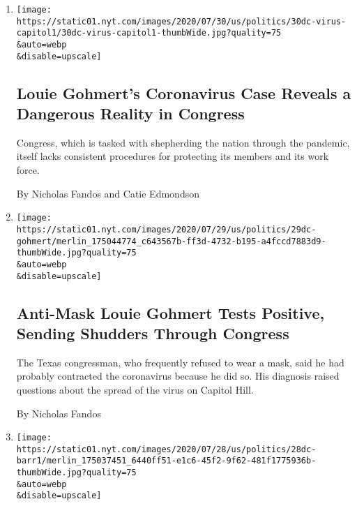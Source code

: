 \begin{enumerate}
\def\labelenumi{\arabic{enumi}.}
\item
  \href{/2020/07/30/us/politics/gohmert-coronavirus-congress.html}{}

  \texttt{[image: https://static01.nyt.com/images/2020/07/30/us/politics/30dc-virus-capitol1/30dc-virus-capitol1-thumbWide.jpg?quality=75\\\&auto=webp\\\&disable=upscale]}

  \hypertarget{louie-gohmerts-coronavirus-case-reveals-a-dangerous-reality-in-congress}{%
  \subsection{Louie Gohmert's Coronavirus Case Reveals a Dangerous
  Reality in
  Congress}\label{louie-gohmerts-coronavirus-case-reveals-a-dangerous-reality-in-congress}}

  Congress, which is tasked with shepherding the nation through the
  pandemic, itself lacks consistent procedures for protecting its
  members and its work force.

  By Nicholas Fandos and Catie Edmondson
\item
  \href{/2020/07/29/us/politics/louie-gohmert-positive-coronavirus-mask.html}{}

  \texttt{[image: https://static01.nyt.com/images/2020/07/29/us/politics/29dc-gohmert/merlin\_175044774\_c643567b-ff3d-4732-b195-a4fccd7883d9-thumbWide.jpg?quality=75\\\&auto=webp\\\&disable=upscale]}

  \hypertarget{anti-mask-louie-gohmert-tests-positive-sending-shudders-through-congress}{%
  \subsection{Anti-Mask Louie Gohmert Tests Positive, Sending Shudders
  Through
  Congress}\label{anti-mask-louie-gohmert-tests-positive-sending-shudders-through-congress}}

  The Texas congressman, who frequently refused to wear a mask, said he
  had probably contracted the coronavirus because he did so. His
  diagnosis raised questions about the spread of the virus on Capitol
  Hill.

  By Nicholas Fandos
\item
  \href{/2020/07/28/us/politics/barr-testimony.html}{}

  \texttt{[image: https://static01.nyt.com/images/2020/07/28/us/politics/28dc-barr1/merlin\_175037451\_6440ff51-e1c6-45f2-9f62-481f1775936b-thumbWide.jpg?quality=75\\\&auto=webp\\\&disable=upscale]}


\end{enumerate}
